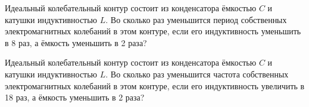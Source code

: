 
\begin{taskbasic}[code={\label{task:elem_osc_v1_n13}}]
Идеальный колебательный контур состоит из конденсатора ёмкостью $C$ и катушки индуктивностью $L$. Во сколько раз уменьшится период собственных электромагнитных колебаний в этом контуре, если его индуктивность уменьшить в 8 раз, а ёмкость уменьшить в 2 раза?

\end{taskbasic}

\begin{taskbasic}[code={\label{task:elem_osc_v2_n13}}]
Идеальный колебательный контур состоит из конденсатора ёмкостью $C$ и катушки индуктивностью $L$. Во сколько раз уменьшится частота собственных электромагнитных колебаний в этом контуре, если его индуктивность увеличить в 18 раз, а ёмкость уменьшить в 2 раза?

\end{taskbasic}

